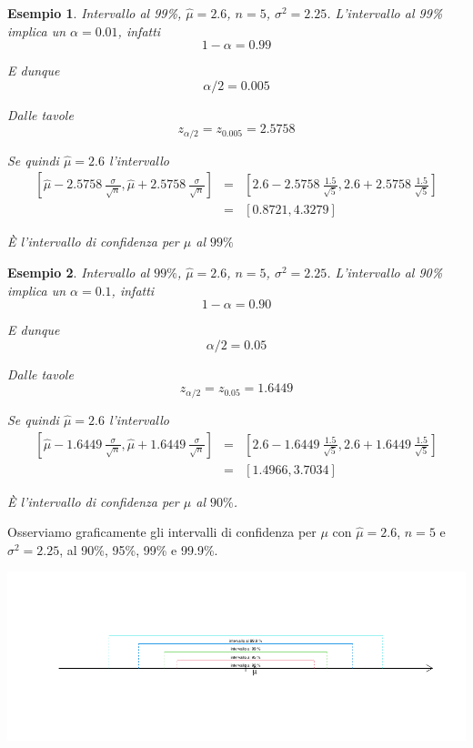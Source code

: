 \documentclass[
  11pt,
]{book}
\theoremstyle{mytheoremstyle}
\theoremstyle{mydefstyle}
\newtheorem{example}{{Esempio}}[section]
\begin{document}
\begin{example}
Intervallo al 99\%, \(\hat \mu=2.6\), \(n=5\), \(\sigma^2=2.25\).
L'intervallo al 99\% implica un \(\alpha=0.01\), infatti
\[1-\alpha=0.99\]

E dunque
\[\alpha/2=0.005\]

Dalle tavole
\[z_{\alpha/2}=z_{0.005}=2.5758\]

Se quindi \(\hat \mu = 2.6\) l'intervallo
\begin{eqnarray*}
 \left[\hat \mu- 2.5758~\frac\sigma{\sqrt n},\hat \mu+ 2.5758~\frac\sigma{\sqrt n}\right] &=&
\left[2.6- 2.5758~\frac{1.5}{\sqrt 5},2.6+ 2.5758~\frac{1.5}{\sqrt 5}\right]\\
 &=& \left[0.8721,4.3279\right]
\end{eqnarray*}

È l'intervallo di confidenza per \(\mu\) al \(99\%\)
\end{example}

\begin{example}
Intervallo al \(99\%\), \(\hat \mu=2.6\), \(n=5\), \(\sigma^2=2.25\). L'intervallo al 90\% implica un \(\alpha=0.1\), infatti
\[1-\alpha=0.90\]

E dunque
\[\alpha/2=0.05\]

Dalle tavole
\[z_{\alpha/2}=z_{0.05}=1.6449\]

Se quindi \(\hat \mu = 2.6\) l'intervallo
\begin{eqnarray*}
 \left[\hat \mu- 1.6449~\frac\sigma{\sqrt n},\hat \mu+ 1.6449~\frac\sigma{\sqrt n}\right] &=&
\left[2.6- 1.6449~\frac{1.5}{\sqrt 5},2.6+ 1.6449~\frac{1.5}{\sqrt 5}\right]\\
 &=& \left[1.4966,3.7034\right]
\end{eqnarray*}

È l'intervallo di confidenza per \(\mu\) al \(90\%\).
\end{example}

Osserviamo graficamente gli intervalli di confidenza per \(\mu\) con \(\hat \mu=2.6\), \(n=5\) e \(\sigma^2=2.25\), al 90\%, 95\%, 99\% e 99.9\%.

\begin{center}\includegraphics{Appunti_di_Statistica_2025_files/figure-latex/13-stima-intervallare-1-1} \end{center}
\end{document}
